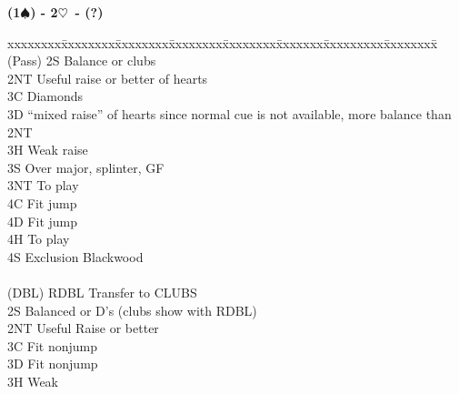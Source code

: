 \documentclass[10pt]{article}
\newcommand{\h}{$\heartsuit$}
\newcommand{\s}{$\spadesuit$}
\newcommand{\x}{DBL}
\newenvironment{bidtable}[1][]
{\textbf{#1}
  \begin{adjustwidth}{1em}{}
    \addvspace{2pt}
    \begin{tabbing}
      xxxxxxxx\=xxxxxxxx\=xxxxxxxx\=xxxxxxxx\=xxxxxxxx\=xxxxxxx\=xxxxxxxxx\=xxxxxxxx\=\kill}
{\end{tabbing}\end{adjustwidth}\bigskip}%
\begin{document}
\begin{bidtable}[(1\s) - 2\h\ - (?)]
(Pass) \> 2S   \> Balance or clubs                                                                 \\
       \> 2NT  \> Useful raise or better of hearts                                                 \\
       \> 3C   \> Diamonds                                                                         \\
       \> 3D   \> “mixed raise” of hearts since normal cue is not available, more balance than 2NT \\
       \> 3H   \> Weak raise                                                                       \\
       \> 3S   \> Over major, splinter, GF                                                         \\
       \> 3NT  \> To play                                                                          \\
       \> 4C   \> Fit jump                                                                         \\
       \> 4D   \> Fit jump                                                                         \\
       \> 4H   \> To play                                                                          \\
       \> 4S   \> Exclusion Blackwood                                                              \\
                                                                                                   \\
(\x)   \> RDBL \> Transfer to CLUBS                                                                \\
       \> 2S   \> Balanced or D’s  (clubs show with RDBL)                                          \\
       \> 2NT  \> Useful Raise or better                                                           \\
       \> 3C   \> Fit nonjump                                                                      \\
       \> 3D   \> Fit nonjump                                                                      \\
       \> 3H   \> Weak                                                                             \\

\end{bidtable}
\end{document}

